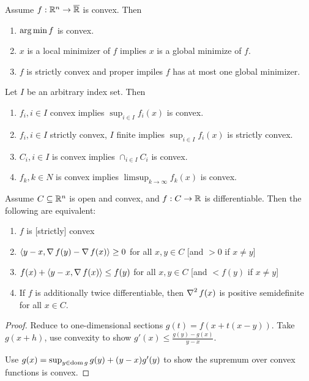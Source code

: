 \begin{thm}
  \label{sec:convexity-7}
  Assume $f: \mathbb{R}^{n} \rightarrow \overline {\mathbb{R}}$ is convex. Then
  \begin{enumerate}
  \item $\operatorname*{arg\,min} f$ is convex.
  \item $x$ is a local minimizer of $f$ implies $x$ is a global
    minimize of $f$.
  \item $f$ is strictly convex and proper impiles $f$ has at most one
    global minimizer.
  \end{enumerate}
\end{thm}

\begin{thm}
  \label{sec:convexity-8}
  Let $I$ be an arbitrary index set. Then
  \begin{enumerate}
  \item $f_{i}, i \in I$ convex implies $\sup_{i \in I} f_{i}(x)$ is
    convex.
  \item $f_{i}, i \in I$ strictly convex, $I$ finite implies $\sup_{i
      \in I} f_{i}(x)$ is strictly convex.
  \item $C_{i}, i \in I$ is convex implies $\cap_{i \in I} C_{i}$ is convex.
  \item $f_{k}, k \in N$ is convex implies $\limsup_{k \rightarrow
      \infty} f_{k}(x)$ is convex.
  \end{enumerate}
\end{thm}

\begin{thm}
  \label{sec:convexity-9}
  Assume $C \subseteq \mathbb{R}^{n}$ is open and convex, and $f: C
  \rightarrow \mathbb{R}$ is differentiable. Then the following are
  equivalent:
  \begin{enumerate}
  \item $f$ is [strictly] convex
  \item $\IP{y-x, \grad f(y) - \grad f(x)} \geq 0$ for all $x, y \in
    C$ [and $> 0$ if $x \neq y$]
  \item $f(x) + \IP{y- x, \grad f(x)} \leq f(y)$ for all $x, y \in C$
    [and $< f(y)$ if $x \neq y$]
  \item If $f$ is additionally twice differentiable, then $\operatorname*{\nabla}^{2}
    f(x)$ is positive semidefinite for all $x \in C$.
  \end{enumerate}
\end{thm}

\begin{proof}
  Reduce to one-dimensional sections $g(t) = f(x + t(x-y))$.  Take
  $g(x+h)$, use convexity to show $g'(x) \leq \frac{g(y) -
    g(x)}{y-x}$.

  Use $g(x) = \sup_{y \in \operatorname*{dom} g} g(y) + (y-x) g'(y)$ to show the
  supremum over convex functions is convex.
\end{proof}

